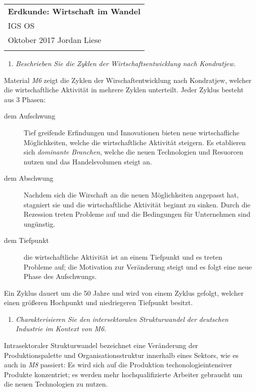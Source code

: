 \documentclass[a4paper,12pt]{article}
\def \dtitle {Erdkunde: Wirtschaft im Wandel}
\begin{document}
\thispagestyle{empty}

\begin{tabular}{p{15.5cm}}
{\large \bf {\dtitle}} \\
IGS OS\\ Oktober 2017 \hspace*{10.5cm} Jordan Liese\\
\midrule
\\
\end{tabular}

\vspace*{0.3cm}
\vspace{0.4cm}


\begin{enumerate}
\item{\textit{Beschrieben Sie die Zyklen der Wirtschaftsentwicklung nach Kondratjew.}}
\end{enumerate}

Material \emph{M6} zeigt die Zyklen der Wirschaftentwicklung nach Kondratjew, welcher die wirtschaftliche Aktivität in mehrere Zyklen unterteilt.
Jeder Zyklus besteht aus 3 Phasen:
\begin{description}
    \item [dem Aufschwung] Tief greifende Erfindungen und Innovationen bieten neue wirtschafliche M\"oglichkeiten, welche die wirtschaftliche Aktivit\"at steigern.
        Es etablieren sich \textit{dominante Branchen}, welche die neuen Technologien und Resuorcen nutzen und das Handelsvolumen steigt an.
    \item [dem Abschwung] Nachdem sich die Wirschaft an die neuen M\"oglichkeiten angepasst hat, stagniert sie und die wirtschaftliche Aktivit\"at beginnt zu sinken.
        Durch die Rezession treten Probleme auf und die Bedingungen f\"ur Unternehmen sind ung\"unstig.
    \item [dem Tiefpunkt] die wirtschaftliche Aktivit\"at ist an einem Tiefpunkt und es treten Probleme auf; die Motivation zur Ver\"anderung steigt und es folgt eine neue
        Phase des Aufschwungs.
\end{description}
Ein Zyklus dauert um die 50 Jahre und wird von einem Zyklus gefolgt, welcher einen gr\"o{\ss}eren Hochpunkt und niedriegeren Tiefpunkt besitzt.

\begin{enumerate}
    \item{\textit{Charakterisieren Sie den intersektoralen Strukturwandel der deutschen Industrie im Kontext von M6.}}
\end{enumerate}
Intrasektoraler Strukturwandel bezeichnet eine Ver\"anderung der Produktionspalette und Organisationsstruktur innerhalb eines Sektors, wie es auch in \textit{M8} passiert: Es wird sich auf die Produktion
techonologieintensiver Produkte konzentriet; es werden mehr hochqualifizierte Arbeiter gebraucht um die neuen Technologien zu nutzen.
\end{document}
